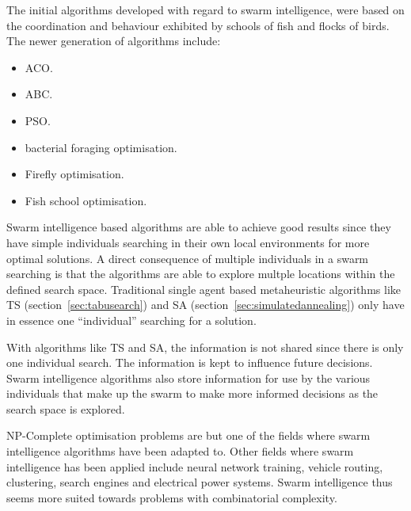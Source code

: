 The initial algorithms developed with regard to swarm intelligence, were based on the coordination and behaviour exhibited by schools of fish and flocks of birds. The newer generation of algorithms include\cite{SwarmArt,ChaoticSwarmIntel,BeeJobShop}:
\begin{itemize}
\item \gls{ACO}\cite{SwarmArt}.
\item \gls{ABC}\cite{BeeJobShop}.
\item \gls{PSO}\cite{ChaoticSwarmIntel}. 
\item bacterial foraging optimisation\cite{CompuIntelligenceIntro}.
\item Firefly optimisation\cite{CompuIntelligenceIntro}.
\item Fish school optimisation\cite{CompuIntelligenceIntro}.
\end{itemize}


Swarm intelligence based algorithms are able to achieve good results since they have simple individuals searching in their own local environments for more optimal solutions\cite{CompuIntelligenceIntro,FundamentalSwarm}. A direct consequence of multiple individuals in a swarm searching is that the algorithms are able to explore multple locations within the defined search space\cite{CompuIntelligenceIntro,FundamentalSwarm}. Traditional single agent based metaheuristic algorithms like \gls{TS} (section~\ref{sec:tabusearch}) and \gls{SA} (section~\ref{sec:simulatedannealing}) only have in essence one ``individual'' searching for a solution\cite{CompuIntelligenceIntro,FundamentalSwarm}. 

With algorithms like \gls{TS} and \gls{SA}, the information is not shared since there is only one individual search\cite{CompuIntelligenceIntro,FundamentalSwarm,SASingleMultiObj,TSHazardous}. The information is kept to influence future decisions\cite{AIModernApproach,TabuMontemanniSmith,TabuVechicleRoutingWithTimeWindows,CurveFittingSA,EcoEquilSA}. Swarm intelligence algorithms also store information for use by the various individuals that make up the swarm to make more informed decisions as the search space is explored\cite{CompuIntelligenceIntro,FundamentalSwarm}.

NP-Complete optimisation problems are but one of the fields where swarm intelligence algorithms have been adapted to. Other fields where swarm intelligence has been applied include neural network training\cite{CompuIntelligenceIntro}, vehicle routing\cite{ACOSurvey}, clustering\cite{AntSwarmClustering}, search engines and electrical power systems\cite{SAElectricPower}. Swarm intelligence thus seems more suited towards problems with combinatorial complexity\cite{SIOPDenby}.

